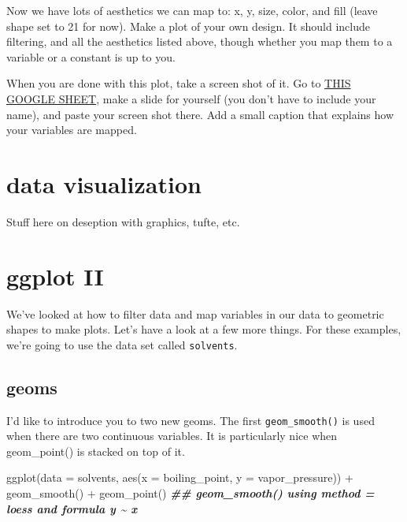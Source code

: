 \documentclass[
]{krantz}
\newenvironment{Shaded}{\begin{snugshade}}{\end{snugshade}}
\newcommand{\AttributeTok}[1]{\textcolor[rgb]{0.77,0.63,0.00}{#1}}
\newcommand{\DocumentationTok}[1]{\textcolor[rgb]{0.56,0.35,0.01}{\textbf{\textit{#1}}}}
\newcommand{\FunctionTok}[1]{\textcolor[rgb]{0.00,0.00,0.00}{#1}}
\newcommand{\NormalTok}[1]{#1}
\newcommand{\SpecialCharTok}[1]{\textcolor[rgb]{0.00,0.00,0.00}{#1}}
\begin{document}
Now we have lots of aesthetics we can map to: x, y, size, color, and fill (leave shape set to 21 for now). Make a plot of your own design. It should include filtering, and all the aesthetics listed above, though whether you map them to a variable or a constant is up to you.

When you are done with this plot, take a screen shot of it. Go to \href{https://docs.google.com/presentation/d/1G0BJ_qye9a_HAPLktFytj66qSj20BjoUOTKtjmCyuN0/edit?usp=sharing}{THIS GOOGLE SHEET}, make a slide for yourself (you don't have to include your name), and paste your screen shot there. Add a small caption that explains how your variables are mapped.

\hypertarget{data-visualization}{%
\section*{data visualization}\label{data-visualization}}

Stuff here on deseption with graphics, tufte, etc.

\hypertarget{ggplot-ii}{%
\section*{ggplot II}\label{ggplot-ii}}

We've looked at how to filter data and map variables in our data to geometric shapes to make plots. Let's have a look at a few more things. For these examples, we're going to use the data set called \texttt{solvents}.

\hypertarget{geoms}{%
\subsection{geoms}\label{geoms}}

I'd like to introduce you to two new geoms. The first \texttt{geom\_smooth()} is used when there are two continuous variables. It is particularly nice when geom\_point() is stacked on top of it.

\begin{Shaded}
\begin{Highlighting}[]
\FunctionTok{ggplot}\NormalTok{(}\AttributeTok{data =}\NormalTok{ solvents, }\FunctionTok{aes}\NormalTok{(}\AttributeTok{x =}\NormalTok{ boiling\_point, }\AttributeTok{y =}\NormalTok{ vapor\_pressure)) }\SpecialCharTok{+} 
  \FunctionTok{geom\_smooth}\NormalTok{() }\SpecialCharTok{+}
  \FunctionTok{geom\_point}\NormalTok{()}
\DocumentationTok{\#\# \textasciigrave{}geom\_smooth()\textasciigrave{} using method = \textquotesingle{}loess\textquotesingle{} and formula \textquotesingle{}y \textasciitilde{} x\textquotesingle{}}
\end{Highlighting}
\end{Shaded}
\end{document}
